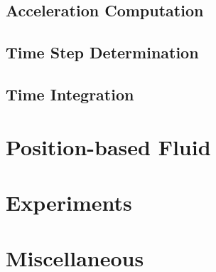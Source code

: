 \documentclass[
	11pt, 
	DIV10,
	ngerman,
	a4paper, 
	oneside, 
	headings=normal, 
	captions=tableheading,
	final, 
	numbers=noenddot
]{scrartcl}
\begin{document}
\subsection{Acceleration Computation}
\subsection{Time Step Determination}
\subsection{Time Integration}

\section{Position-based Fluid}
\label{sec3}
\section{Experiments}
\label{sec4}
\section{Miscellaneous}
\label{sec5}

% 
% 
\end{document}
